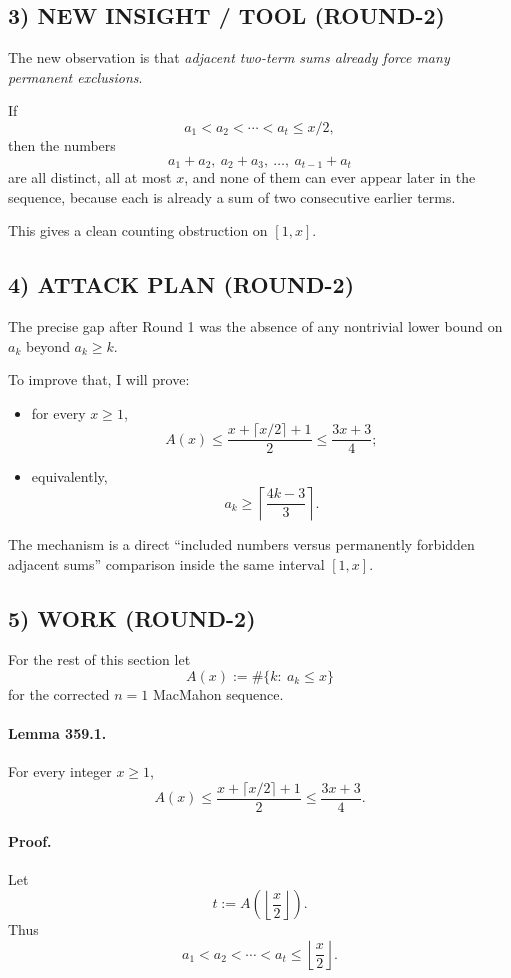 \subsection*{3) NEW INSIGHT / TOOL (ROUND-2)}
The new observation is that \emph{adjacent two-term sums already force many permanent exclusions}.

If
\[
a_1<a_2<\cdots<a_t\le x/2,
\]
then the numbers
\[
a_1+a_2,\ a_2+a_3,\ \dots,\ a_{t-1}+a_t
\]
are all distinct, all at most $x$, and none of them can ever appear later in the sequence, because each is already a sum of two consecutive earlier terms.

This gives a clean counting obstruction on $[1,x]$.

\subsection*{4) ATTACK PLAN (ROUND-2)}
The precise gap after Round 1 was the absence of any nontrivial lower bound on $a_k$ beyond $a_k\ge k$.

To improve that, I will prove:

\begin{itemize}
\item[(i)] for every $x\ge 1$,
\[
A(x)\le \frac{x+\lceil x/2\rceil+1}{2}\le \frac{3x+3}{4};
\]
\item[(ii)] equivalently,
\[
a_k\ge \left\lceil \frac{4k-3}{3}\right\rceil.
\]
\end{itemize}

The mechanism is a direct ``included numbers versus permanently forbidden adjacent sums'' comparison inside the same interval $[1,x]$.

\subsection*{5) WORK (ROUND-2)}

For the rest of this section let
\[
A(x):=\#\{k:\ a_k\le x\}
\]
for the corrected $n=1$ MacMahon sequence.

\paragraph{Lemma 359.1.}
For every integer $x\ge 1$,
\[
A(x)\le \frac{x+\lceil x/2\rceil+1}{2}\le \frac{3x+3}{4}.
\]

\paragraph{Proof.}
Let
\[
t:=A\!\left(\left\lfloor \frac{x}{2}\right\rfloor\right).
\]
Thus
\[
a_1<a_2<\cdots<a_t\le \left\lfloor \frac{x}{2}\right\rfloor.
\]

